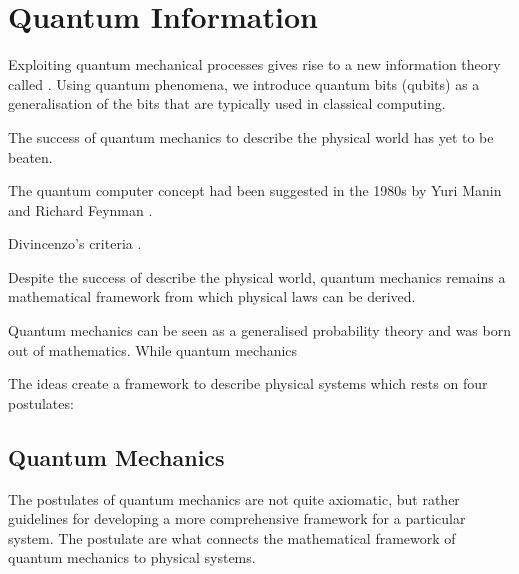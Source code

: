 %
%
%

\section{Quantum Information}

Exploiting quantum mechanical processes gives rise to a new information theory called . Using quantum phenomena, we introduce quantum bits (qubits) as a generalisation of the bits that are typically used in classical computing.

The success of quantum mechanics to describe the physical world has yet to be beaten. 

The quantum computer concept had been suggested in the 1980s by Yuri Manin \cite{manin1980computable} and Richard Feynman \cite{feynman1982simulating}.

Divincenzo's criteria \cite{divincenzo2000physical}.

Despite the success of describe the physical world, quantum mechanics remains a mathematical framework from which physical laws can be derived. 

Quantum mechanics can be seen as a generalised probability theory and was born out of mathematics. While quantum mechanics 

The ideas create a framework to describe physical systems which rests on four postulates:

\subsection{Quantum Mechanics}

The postulates of quantum mechanics are not quite axiomatic, but rather guidelines for developing a more comprehensive framework for a particular system. The postulate are what connects the mathematical framework of quantum mechanics to physical systems.

